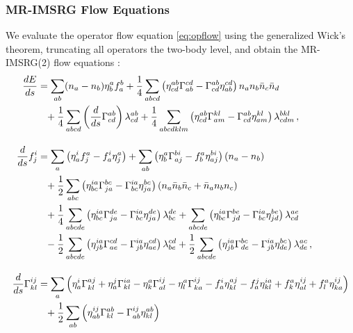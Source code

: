 {\subsubsection{MR-IMSRG Flow Equations}
We evaluate the operator flow equation \eqref{eq:opflow} using the generalized
Wick's theorem, truncating all operators the two-body level, and obtain the 
MR-IMSRG(2) flow equations \cite{Hergert:2013ij,Hergert:2014vn,Hergert:2017kx}:
\begin{align}
  \totd{E}{s} &=     
    \sum_{ab}(n_{a}-n_{b})\eta^{a}_{b}f^{b}_{a}
    +\frac{1}{4}\sum_{abcd}
        \left(\eta^{ab}_{cd}\Gamma^{cd}_{ab}-\Gamma^{ab}_{cd}\eta^{cd}_{ab}\right)
        n_{a}n_{b}\bar{n}_{c}\bar{n}_{d}
    \notag\\
  &\hphantom{=}
    +\frac{1}{4}\sum_{abcd}\left(\totd{}{s}\Gamma^{ab}_{cd}\right)\lambda^{ab}_{cd}
    +\frac{1}{4}\sum_{abcdklm}\left(\eta^{ab}_{cd}\Gamma^{kl}_{am}-\Gamma^{ab}_{cd}\eta^{kl}_{am}\right)\lambda^{bkl}_{cdm}\,,
    \label{eq:mr_flow_0b_tens}
  \\[10pt]
% 
  \totd{}{s}f^{i}_{j} &=
    \sum_{a}\left(\eta^{i}_{a}f^{a}_{j}-f^{i}_{a}\eta^{a}_{j}\right)
    +\sum_{ab}\left(\eta^{a}_{b}\Gamma^{bi}_{aj}-f^{a}_{b}\eta^{bi}_{aj}\right)(n_{a}-n_{b})
  \notag\\
  &\hphantom{=}
  +\frac{1}{2}\sum_{abc}
    \left(\eta^{ia}_{bc}\Gamma^{bc}_{ja}-\Gamma^{ia}_{bc}\eta^{bc}_{ja}\right)\left(n_{a}\bar{n}_{b}\bar{n}_{c}+\bar{n}_{a}n_{b}n_{c}\right)
  \notag\\
  &\hphantom{=}
      +\frac{1}{4}\sum_{abcde}\left(\eta^{ia}_{bc}\Gamma^{de}_{ja}-\Gamma^{ia}_{bc}\eta^{de}_{ja}\right)\lambda^{de}_{bc} 
    +\sum_{abcde}\left(\eta^{ia}_{bc}\Gamma^{be}_{jd}-\Gamma^{ia}_{bc}\eta^{be}_{jd}\right)\lambda^{ae}_{cd}
  \notag\\
  &\hphantom{=}
      -\frac{1}{2}\sum_{abcde}\left(\eta^{ia}_{jb}\Gamma^{cd}_{ae}-\Gamma^{ia}_{jb}\eta^{cd}_{ae}\right)\lambda^{cd}_{be}
    +\frac{1}{2}\sum_{abcde}\left(\eta^{ia}_{jb}\Gamma^{bc}_{de}-\Gamma^{ia}_{jb}\eta^{bc}_{de}\right)\lambda^{ac}_{de}\,,
  \label{eq:mr_flow_1b_tens}\\[10pt]
%
  \totd{}{s}\Gamma^{ij}_{kl}&=  
  \sum_{a}\left(\eta^{i}_{a}\Gamma^{aj}_{kl}+\eta^{j}_{a}\Gamma^{ia}_{kl}-\eta^{a}_{k}\Gamma^{ij}_{al}-\eta^{a}_{l}\Gamma^{ij}_{ka}
  -f^{i}_{a}\eta^{aj}_{kl}-f^{j}_{a}\eta^{ia}_{kl}+f^{a}_{k}\eta^{ij}_{al}+f^{a}_{l}\eta^{ij}_{ka}\right)
  \notag\\
  &\hphantom{=}
    +\frac{1}{2}\sum_{ab}\left(\eta^{ij}_{ab}\Gamma^{ab}_{kl}-\Gamma^{ij}_{ab}\eta^{ab}_{kl}\right)

\end{align}}

